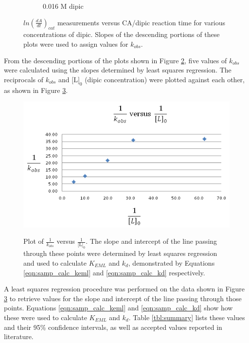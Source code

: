 \begin{figure}[h]
\begin{subfigure}{0.5\textwidth}
                \caption{0.016 M dipic}
                \label{fig:0.016M_dipic_readings}
        \end{subfigure}
        \caption{$ln \left(\frac{dA}{dt}\right)_{cat}$ measurements versus CA/dipic reaction time for various concentrations of dipic. Slopes of the descending portions of these plots were used to assign values for $k_{obs}$.}\label{fig:kobs_results}
\end{figure}

From the descending portions of the plots shown in Figure \ref{fig:kobs_results}, five values of $k_{obs}$ were calculated using the slopes determined by least squares regression. The reciprocals of $k_{obs}$ and $\text{[L]}_0$ (dipic concentration) were plotted against each other, as shown in Figure \ref{fig:kobs_vs_l}.

\begin{figure}[h]
  \includegraphics[scale=.5]{./Figures/kobs_vs_l.png}\\
  \caption{Plot of $\frac{1}{k_{obs}}$ versus $\frac{1}{\text{[L]}_0}$. The slope and intercept of the line passing through these points were determined by least squares regression and used to calculate $K_{EML}$ and $k_d$, demonstrated by Equations \eqref{eqn:samp_calc_keml} and \eqref{eqn:samp_calc_kd} respectively.}\label{fig:kobs_vs_l}
\end{figure}

A least squares regression procedure was performed on the data shown in Figure \ref{fig:kobs_vs_l} to retrieve values for the slope and intercept of the line passing through those points. Equations \eqref{eqn:samp_calc_keml} and \eqref{eqn:samp_calc_kd} show how these were used to calculate $K_{EML}$ and $k_d$. Table \ref{tbl:summary} lists these values and their 95\% confidence intervals, as well as accepted values reported in literature.

